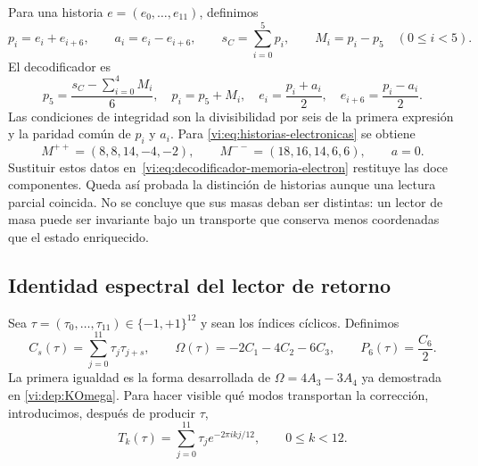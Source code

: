 Para una historia $e=(e_0,\ldots,e_{11})$, definimos
\begin{equation}
 p_i=e_i+e_{i+6},\qquad a_i=e_i-e_{i+6},
 \qquad s_C=\sum_{i=0}^{5}p_i,
 \qquad M_i=p_i-p_5\quad(0\leq i<5).
 \label{vi:eq:codificador-memoria-electron}
\end{equation}
El decodificador es
\begin{equation}
 p_5=\frac{s_C-\sum_{i=0}^{4}M_i}{6},\quad
 p_i=p_5+M_i,\quad
 e_i=\frac{p_i+a_i}{2},\quad e_{i+6}=\frac{p_i-a_i}{2}.
 \label{vi:eq:decodificador-memoria-electron}
\end{equation}
Las condiciones de integridad son la divisibilidad por seis de la primera
expresión y la paridad común de $p_i$ y $a_i$. Para
\eqref{vi:eq:historias-electronicas} se obtiene
\[
 M^{++}=(8,8,14,-4,-2),\qquad
 M^{--}=(18,16,14,6,6),\qquad a=0.
\]
Sustituir estos datos en~\eqref{vi:eq:decodificador-memoria-electron}
restituye las doce componentes. Queda así probada la distinción de historias
aunque una lectura parcial coincida. No se concluye que sus masas deban ser
distintas: un lector de masa puede ser invariante bajo un transporte que
conserva menos coordenadas que el estado enriquecido.

\subsection{Identidad espectral del lector de retorno}

Sea $\tau=(\tau_0,\ldots,\tau_{11})\in\{-1,+1\}^{12}$ y sean los índices
cíclicos. Definimos
\begin{equation}
 C_s(\tau)=\sum_{j=0}^{11}\tau_j\tau_{j+s},
 \qquad
 \Omega(\tau)=-2C_1-4C_2-6C_3,
 \qquad
 P_6(\tau)=\frac{C_6}{2}.
 \label{vi:eq:lectores-correlacion}
\end{equation}
La primera igualdad es la forma desarrollada de
$\Omega=4A_3-3A_4$ ya demostrada en
\eqref{vi:dep:KOmega}. Para hacer visible qué modos transportan la
corrección, introducimos, después de producir $\tau$,
\begin{equation}
 T_k(\tau)=\sum_{j=0}^{11}\tau_j
 e^{-2\pi i k j/12},\qquad 0\leq k<12.
 \label{vi:eq:dft-retorno}
\end{equation}

